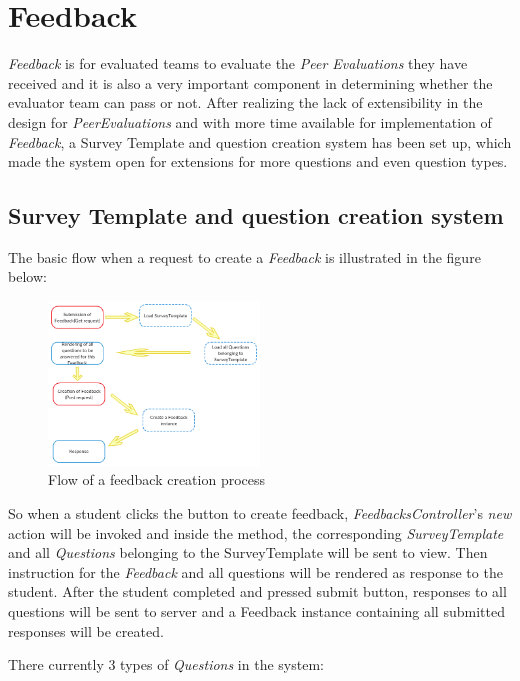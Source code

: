 \chapter{Feedback}

\textit{Feedback} is for evaluated teams to evaluate the \textit{Peer Evaluations} they have received and it is also a very important component in determining whether the evaluator team can pass or not. After realizing the lack of extensibility in the design for \textit{PeerEvaluations} and with more time available for implementation of \textit{Feedback}, a Survey Template and question creation system has been set up, which made the system open for extensions for more questions and even question types.

\section{Survey Template and question creation system}

The basic flow when a request to create a \textit{Feedback} is illustrated in the figure below:

\begin{figure}[h]
    \centering
    \includegraphics[width=0.5\textwidth]{Images/Skylab_Feedback_Flow.png}
    \caption{Flow of a feedback creation process}
\end{figure}

So when a student clicks the button to create feedback, \textit{FeedbacksController}'s \textit{new} action will be invoked and inside the method, the corresponding \textit{SurveyTemplate} and all \textit{Questions} belonging to the SurveyTemplate will be sent to view. Then instruction for the \textit{Feedback} and all questions will be rendered as response to the student. After the student completed and pressed submit button, responses to all questions will be sent to server and a Feedback instance containing all submitted responses will be created.

There currently 3 types of \textit{Questions} in the system:


